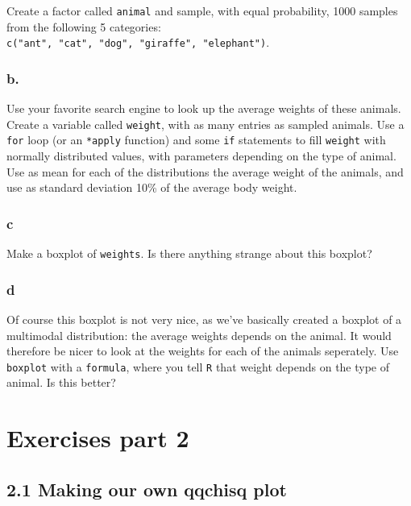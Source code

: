 \documentclass[]{article}
\begin{document}
Create a factor called \texttt{animal} and sample, with equal
probability, 1000 samples from the following 5 categories:
\texttt{c("ant",\ "cat",\ "dog",\ "giraffe",\ "elephant")}.

\hypertarget{b.}{%
\subsubsection{b.}\label{b.}}

Use your favorite search engine to look up the average weights of these
animals. Create a variable called \texttt{weight}, with as many entries
as sampled animals. Use a \texttt{for} loop (or an \texttt{*apply}
function) and some \texttt{if} statements to fill \texttt{weight} with
normally distributed values, with parameters depending on the type of
animal. Use as mean for each of the distributions the average weight of
the animals, and use as standard deviation 10\% of the average body
weight.

\hypertarget{c-5}{%
\subsubsection{c}\label{c-5}}

Make a boxplot of \texttt{weights}. Is there anything strange about this
boxplot?

\hypertarget{d-4}{%
\subsubsection{d}\label{d-4}}

Of course this boxplot is not very nice, as we've basically created a
boxplot of a multimodal distribution: the average weights depends on the
animal. It would therefore be nicer to look at the weights for each of
the animals seperately. Use \texttt{boxplot} with a \texttt{formula},
where you tell \texttt{R} that weight depends on the type of animal. Is
this better?

\newpage

\hypertarget{exercises-part-2}{%
\section{Exercises part 2}\label{exercises-part-2}}

\hypertarget{making-our-own-qqchisq-plot}{%
\subsection{2.1 Making our own qqchisq
plot}\label{making-our-own-qqchisq-plot}}
\end{document}
